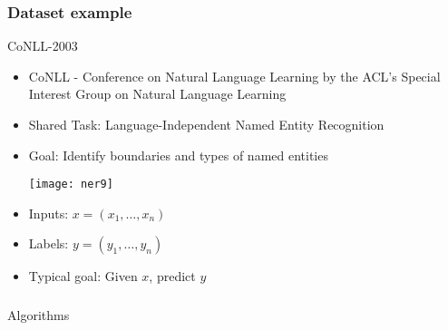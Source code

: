 \begin{frame}[fragile]\frametitle{Dataset example}

CoNLL-2003

  \begin{itemize}
  \item CoNLL - Conference on Natural Language Learning by the ACL's Special Interest Group on Natural Language Learning
  \item Shared Task: Language-Independent Named Entity Recognition
  \item Goal: Identify boundaries and types of named entities
\begin{center}
\texttt{[image: ner9]}
\end{center}
\item Inputs: $x = (x_1,\ldots, x_n)$
\item Labels: $y = (y_1,\ldots, y_n)$
\item Typical goal: Given $x$, predict $y$

  \end{itemize}
\end{frame}

\begin{frame}[fragile]\frametitle{}

\begin{center}
{\Large Algorithms}
\end{center}
\end{frame}




